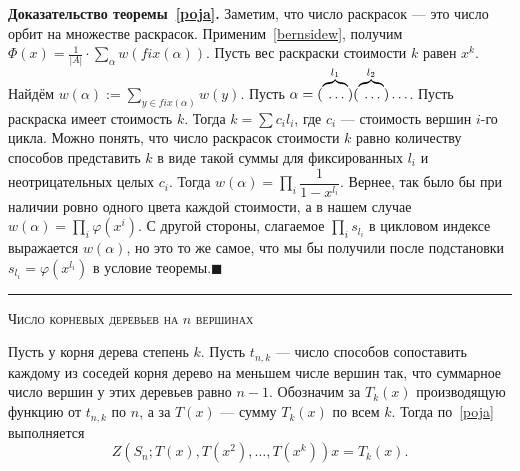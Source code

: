 \documentclass[a4paper,12pt]{article}
\newcommand*{\prooft}[1]{{\bf Доказательство теоремы~\ref{#1}. }}
\newcommand*{\QEDA}{\hfill\ensuremath{\blacksquare}}
\begin{document}
\newpage
\prooft{poja} Заметим, что число раскрасок ---  это число орбит на множестве раскрасок. Применим~\ref{bernsidew}, получим $\Phi(x)=\frac1{|A|}\cdot\sum\limits_\alpha w(fix(\alpha))$. Пусть вес раскраски стоимости $k$ равен $x^k$. Найдём $w(\alpha):=\sum\limits_{y\in fix(\alpha)}w(y)$. Пусть $\alpha=(\overbrace{\vphantom|\ldots}^{l_1})(\overbrace{\vphantom|\ldots}^{l_2})\ldots$. Пусть раскраска имеет стоимость $k$. Тогда $k=\sum c_il_i$, где $c_i$ --- стоимость вершин $i$-го цикла. Можно понять, что число раскрасок стоимости $k$ равно количеству способов представить $k$ в виде такой суммы для фиксированных $l_i$ и неотрицательных целых $c_i$. Тогда $w(\alpha)=\prod\limits_i\dfrac1{1-x^{l_i}}$. Вернее, так было бы при наличии ровно одного цвета каждой стоимости, а в нашем случае $w(\alpha)=\prod\limits_i\varphi(x^i)$. С другой стороны, слагаемое $\prod\limits_is_{l_i}$ в цикловом индексе выражается $w(\alpha)$, но это то же самое, что мы бы получили после подстановки $s_{l_i}=\varphi(x^{l_i})$ в условие теоремы.\QEDA\\

\vskip8pt\hrule\vskip8pt
\centerline{\large\scshape Число корневых деревьев на $n$ вершинах}
Пусть у корня дерева степень $k$. Пусть $t_{n,k}$ --- число способов сопоставить каждому из соседей корня дерево на меньшем числе вершин так, что суммарное число вершин у этих деревьев равно $n-1$. Обозначим за $T_k(x)$ производящую функцию от $t_{n,k}$ по $n$, а за $T(x)$ --- сумму $T_k(x)$ по всем $k$. Тогда по~\ref{poja} выполняется \[
	Z(S_n;T(x),T(x^2),\ldots,T(x^k))x=T_k(x)
.\]
\end{document}
